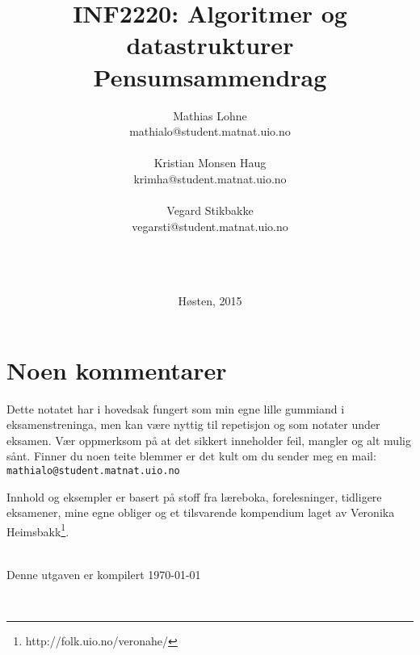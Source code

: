 \documentclass[10pt,norsk,a4paper,hidelinks]{article}
\title{\sffamily \Huge INF2220: Algoritmer og datastrukturer\\ Pensumsammendrag}
\author{\sffamily Mathias Lohne\\ \footnotesize\sffamily mathialo@student.matnat.uio.no\\~\\\sffamily Kristian Monsen Haug\\ \footnotesize\sffamily krimha@student.matnat.uio.no \\~\\ \sffamily Vegard Stikbakke \\ \footnotesize \footnotesize\sffamily vegarsti@student.matnat.uio.no}
\date{~\\~\\~\\\sffamily Høsten, 2015}
\theoremstyle{indented}
\begin{document}
\maketitle
\thispagestyle{empty}
\vfill
\newpage
{}

\section*{Noen kommentarer}
Dette notatet har i hovedsak fungert som min egne lille gummiand i eksamenstreninga, men kan være nyttig til repetisjon og som notater under eksamen. Vær oppmerksom på at det sikkert inneholder feil, mangler og alt mulig sånt. Finner du noen teite blemmer er det kult om du sender meg en mail: \verb|mathialo@student.matnat.uio.no|

Innhold og eksempler er basert på stoff fra læreboka, forelesninger, tidligere eksamener, mine egne obliger og et tilsvarende kompendium laget av Veronika Heimsbakk\footnote{http://folk.uio.no/veronahe/}.

~\\Denne utgaven er kompilert \today

~\\

\tableofcontents
\newpage

\newpage
\newpage
\newpage
\newpage

\newpage

\newpage
\newpage



\end{document}
